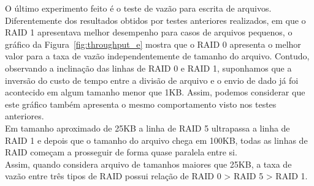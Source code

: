 	
	O último experimento feito é o teste de vazão para escrita de arquivos.
	Diferentemente dos resultados obtidos por testes anteriores realizados, em que o RAID 1 apresentava melhor desempenho para casos de arquivos pequenos, o gráfico da Figura~\ref{fig:throughput_e} mostra que o RAID 0 apresenta o melhor valor para a taxa de vazão independentemente de tamanho do arquivo. 
	Contudo, observando a inclinação das linhas de RAID 0 e RAID 1, suponhamos que a inversão do custo de tempo entre a divisão de arquivo e o envio de dado já foi acontecido em algum tamanho menor que 1KB. Assim, podemos considerar que este gráfico também apresenta o mesmo comportamento visto nos testes anteriores. 
	\\
	Em tamanho aproximado de 25KB a linha de RAID 5 ultrapassa a linha de RAID 1 e depois que o tamanho do arquivo chega em 100KB, todas as linhas de RAID começam a prosseguir de forma quase paralela entre si.
	\\
	
	Assim, quando considera arquivo de tamanhos maiores que 25KB, a taxa de vazão entre três tipos de RAID possui relação de RAID 0 > RAID 5 > RAID 1.
	\\
	
